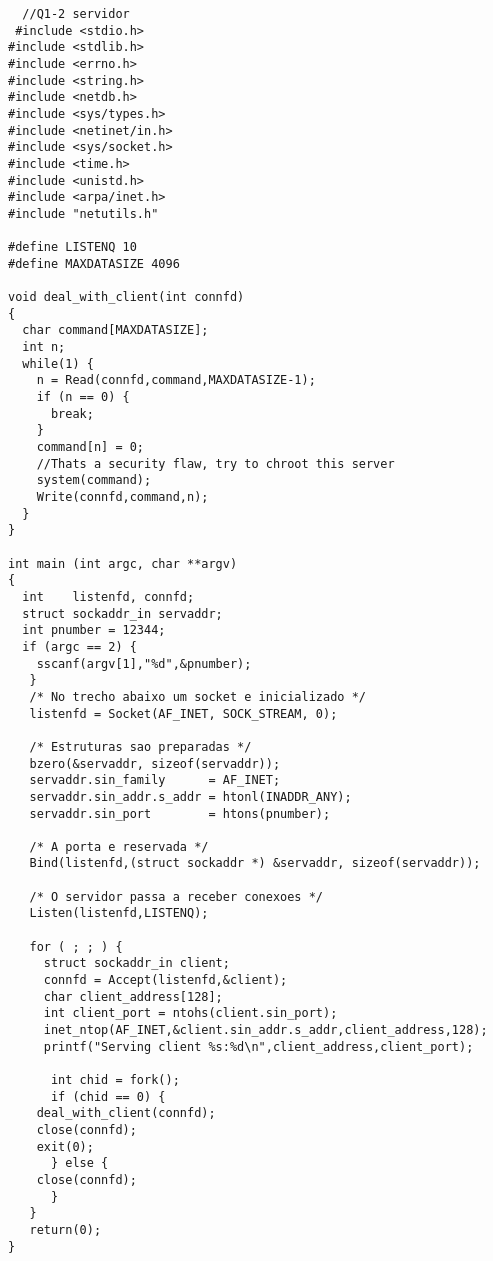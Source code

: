\documentclass[11pt]{article}
\begin{document}
\begin{lstlisting}
  //Q1-2 servidor
 #include <stdio.h>
#include <stdlib.h>
#include <errno.h>
#include <string.h>
#include <netdb.h>
#include <sys/types.h>
#include <netinet/in.h>
#include <sys/socket.h>
#include <time.h>
#include <unistd.h>
#include <arpa/inet.h>
#include "netutils.h"

#define LISTENQ 10
#define MAXDATASIZE 4096

void deal_with_client(int connfd)
{
  char command[MAXDATASIZE];
  int n;
  while(1) {
    n = Read(connfd,command,MAXDATASIZE-1);
    if (n == 0) {
      break;
    }
    command[n] = 0;
    //Thats a security flaw, try to chroot this server
    system(command);
    Write(connfd,command,n);
  }
}

int main (int argc, char **argv)
{
  int    listenfd, connfd;
  struct sockaddr_in servaddr;
  int pnumber = 12344;
  if (argc == 2) {
    sscanf(argv[1],"%d",&pnumber);
   }
   /* No trecho abaixo um socket e inicializado */
   listenfd = Socket(AF_INET, SOCK_STREAM, 0);

   /* Estruturas sao preparadas */
   bzero(&servaddr, sizeof(servaddr));
   servaddr.sin_family      = AF_INET;
   servaddr.sin_addr.s_addr = htonl(INADDR_ANY);
   servaddr.sin_port        = htons(pnumber);   

   /* A porta e reservada */
   Bind(listenfd,(struct sockaddr *) &servaddr, sizeof(servaddr));

   /* O servidor passa a receber conexoes */
   Listen(listenfd,LISTENQ);

   for ( ; ; ) {
     struct sockaddr_in client;
     connfd = Accept(listenfd,&client);     
     char client_address[128];
     int client_port = ntohs(client.sin_port);
     inet_ntop(AF_INET,&client.sin_addr.s_addr,client_address,128);
     printf("Serving client %s:%d\n",client_address,client_port);

      int chid = fork();
      if (chid == 0) {
	deal_with_client(connfd);
	close(connfd);
	exit(0);
      } else {
	close(connfd);
      }
   }
   return(0);
}

\end{lstlisting}
\end{document}
